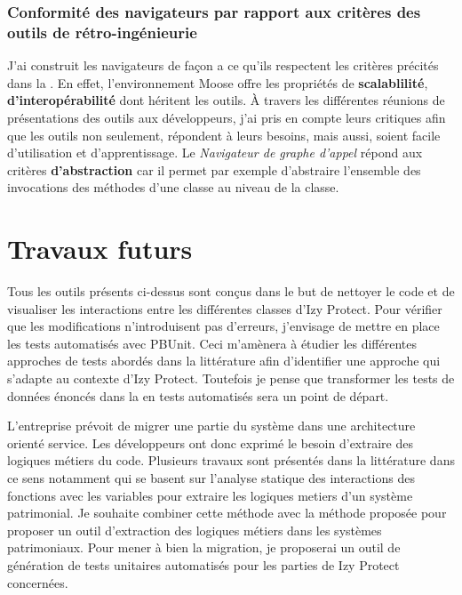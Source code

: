 \documentclass[a4paper]{article}
\begin{document}
 \subsubsection{Conformité des navigateurs par rapport aux critères des outils de rétro-ingénieurie}
J'ai construit les  navigateurs de façon a ce qu'ils respectent les critères précités dans la .
En effet, l'environnement Moose offre les propriétés de \textbf{scalablilité}, \textbf{d'interopérabilité} \cite{Duca05a} dont héritent les outils. 
À travers les différentes réunions de présentations des outils aux développeurs, j'ai pris en compte  leurs critiques  afin que les outils non seulement, répondent à leurs besoins, mais aussi, soient facile d'utilisation et d'apprentissage.
 Le \textit{Navigateur de graphe d'appel}  répond aux critères  \textbf{d'abstraction} car il permet par exemple d'abstraire l'ensemble des invocations des méthodes d'une classe au niveau de la classe.
 



\section{Travaux futurs}
\label{sec:roadmap}
Tous les outils présents ci-dessus sont conçus dans le but de nettoyer le code et de visualiser les interactions entre les différentes classes d'Izy Protect.
Pour vérifier que  les modifications n'introduisent pas d'erreurs, j'envisage de mettre en place les tests automatisés avec PBUnit. 
Ceci m'amènera à étudier les différentes approches de tests abordés dans la littérature afin d'identifier une approche qui s'adapte au contexte d'Izy Protect. 
Toutefois je pense que transformer les tests de données énoncés dans la  en tests automatisés sera un point de départ. 

L'entreprise prévoit de migrer une partie du système dans une architecture orienté service. 
Les développeurs ont donc exprimé le besoin d'extraire des logiques métiers du code.
Plusieurs travaux sont présentés dans la littérature dans ce sens  notamment \cite{Lei05a,Cose12a,Norm12a} qui se basent sur l'analyse statique des interactions des fonctions avec les variables pour extraire les logiques metiers d'un système patrimonial. 
Je souhaite combiner cette méthode avec la méthode proposée \cite{anqu19a} pour proposer un outil d'extraction des logiques métiers dans les systèmes patrimoniaux.
Pour mener à bien la migration, je proposerai un outil de génération de tests unitaires automatisés pour les parties de Izy Protect concernées.
\end{document}
